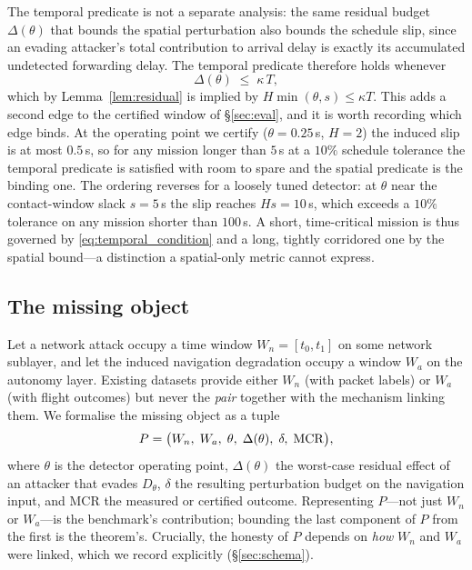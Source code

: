 The temporal predicate is not a separate analysis: the same residual budget
$\Delta(\theta)$ that bounds the spatial perturbation also bounds the schedule
slip, since an evading attacker's total contribution to arrival delay is exactly
its accumulated undetected forwarding delay. The temporal predicate therefore
holds whenever
\begin{equation}
\label{eq:temporal_condition}
\Delta(\theta)\;\le\;\kappa\,T ,
\end{equation}
which by Lemma~\ref{lem:residual} is implied by $H\min(\theta,s)\le\kappa T$.
This adds a second edge to the certified window of \S\ref{sec:eval}, and it is
worth recording which edge binds. At the operating point we certify
($\theta=0.25$\,s, $H=2$) the induced slip is at most $0.5$\,s, so for any
mission longer than $5$\,s at a $10\%$ schedule tolerance the temporal predicate
is satisfied with room to spare and the spatial predicate is the binding one.
The ordering reverses for a loosely tuned detector: at $\theta$ near the
contact-window slack $s=5$\,s the slip reaches $H s = 10$\,s, which exceeds a
$10\%$ tolerance on any mission shorter than $100$\,s. A short, time-critical
mission is thus governed by \eqref{eq:temporal_condition} and a long, tightly
corridored one by the spatial bound---a distinction a spatial-only metric
cannot express.

\subsection{The missing object}
\label{sec:formulation}
Let a network attack occupy a time window $W_n=[t_0,t_1]$ on some network
sublayer, and let the induced navigation degradation occupy a window $W_a$ on
the autonomy layer. Existing datasets provide either $W_n$ (with packet labels)
or $W_a$ (with flight outcomes) but never the \emph{pair} together with the
mechanism linking them. We formalise the missing object as a tuple
\begin{equation}
\label{eq:pairing}
P = \big(W_n,\; W_a,\; \theta,\; \Delta(\theta),\; \delta,\; \mathrm{MCR}\big),
\end{equation}
where $\theta$ is the detector operating point, $\Delta(\theta)$ the worst-case
residual effect of an attacker that evades $D_\theta$, $\delta$ the resulting
perturbation budget on the navigation input, and MCR the measured or certified
outcome. Representing $P$---not just $W_n$ or $W_a$---is the benchmark's
contribution; bounding the last component of $P$ from the first is the
theorem's. Crucially, the honesty of $P$ depends on \emph{how} $W_n$ and $W_a$
were linked, which we record explicitly (\S\ref{sec:schema}).

